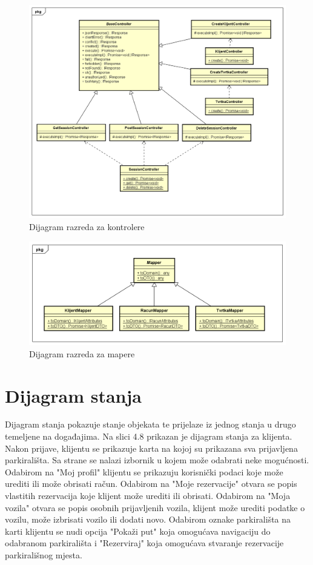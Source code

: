 		\begin{figure}[H]
			\includegraphics[width=1\linewidth]{dijagrami/Class Diagram - controllers.png}
			\caption{Dijagram razreda za kontrolere}
			\label{fig:Dijagram razreda - Kontroleri} 
		\end{figure}	
		\begin{figure}[H]
			\includegraphics[width=1\linewidth]{dijagrami/Class Diagram - mappers.png}
			\caption{Dijagram razreda za mapere}
			\label{fig:Dijagram razreda - Maperri} 
		\end{figure}
			
			
			\eject
		
		\section{Dijagram stanja}
			
			Dijagram stanja pokazuje stanje objekata te prijelaze iz jednog stanja u drugo temeljene na događajima. Na slici 4.8 prikazan je dijagram stanja za klijenta. Nakon prijave, klijentu se prikazuje karta na kojoj su prikazana sva prijavljena parkirališta. Sa strane se nalazi izbornik u kojem može odabrati neke mogućnosti. Odabirom na "Moj profil" klijentu se prikazuju korisnički podaci koje može urediti ili može obrisati račun. Odabirom na "Moje rezervacije" otvara se popis vlastitih rezervacija koje klijent može urediti ili obrisati. Odabirom na "Moja vozila" otvara se popis osobnih prijavljenih vozila, klijent može urediti podatke o vozilu, može izbrisati vozilo ili dodati novo. Odabirom oznake parkirališta na karti klijentu se nudi opcija "Pokaži put" koja omogućava navigaciju do odabranom parkirališta i "Rezerviraj" koja omogućava stvaranje rezervacije parkirališnog mjesta.
			
